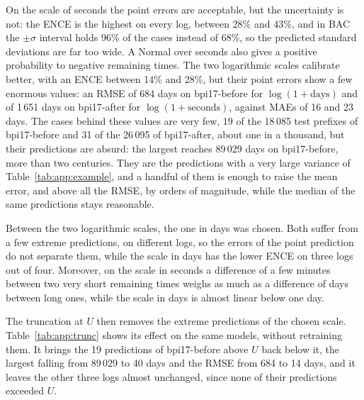On the scale of seconds the point errors are acceptable, but the
uncertainty is not: the ENCE is the highest on every log, between 28\% and
43\%, and in BAC the $\pm\sigma$ interval holds 96\% of the cases instead of
68\%, so the predicted standard deviations are far too wide. A Normal over
seconds also gives a positive probability to negative remaining times. The
two logarithmic scales calibrate better, with an ENCE between 14\% and 28\%,
but their point errors show a few enormous values: an RMSE of 684 days on
bpi17-before for $\log(1 + \text{days})$ and of 1\,651 days on bpi17-after
for $\log(1 + \text{seconds})$, against MAEs of 16 and 23 days. The cases
behind these values are very few, 19 of the 18\,085 test prefixes of
bpi17-before and 31 of the 26\,095 of bpi17-after, about one in a thousand,
but their predictions are absurd: the largest reaches 89\,029 days on
bpi17-before, more than two centuries. They are the predictions with a very
large variance of Table~\ref{tab:app:example}, and a handful of them is
enough to raise the mean error, and above all the RMSE, by orders of
magnitude, while the median of the same predictions stays reasonable.

Between the two logarithmic scales, the one in days was chosen. Both suffer
from a few extreme predictions, on different logs, so the errors of the point
prediction do not separate them, while the scale in days has the lower ENCE
on three logs out of four. Moreover, on the scale in seconds a difference of
a few minutes between two very short remaining times weighs as much as a
difference of days between long ones, while the scale in days is almost
linear below one day.

The truncation at $U$ then removes the extreme predictions of the chosen
scale. Table~\ref{tab:app:trunc} shows its effect on the same models,
without retraining them. It brings the 19 predictions of bpi17-before above
$U$ back below it, the largest falling from 89\,029 to 40 days and the RMSE
from 684 to 14 days, and it leaves the other three logs almost unchanged,
since none of their predictions exceeded $U$.

